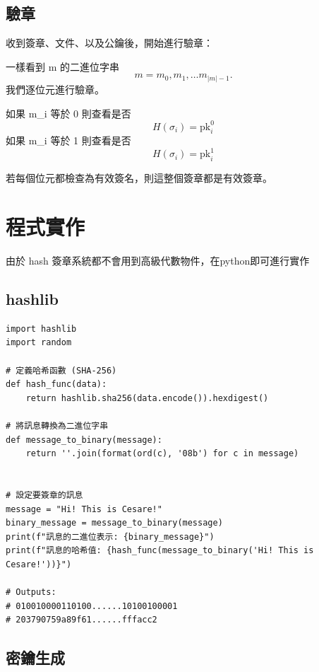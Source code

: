 \documentclass[
]{article}
\begin{document}
\hypertarget{ux9a57ux7ae0}{%
\subsection{驗章}\label{ux9a57ux7ae0}}

收到簽章、文件、以及公鑰後，開始進行驗章：

一樣看到 m 的二進位字串 \[
m = m_{0},m_{1},\dots m_{|m|-1}.
\] 我們逐位元進行驗章。

如果 m\_i 等於 0 則查看是否 \[
H(\sigma_{i}) = \mathrm{pk}_{i}^{0}
\] 如果 m\_i 等於 1 則查看是否 \[
H(\sigma_{i}) = \mathrm{pk}_{i}^{1}
\]

若每個位元都檢查為有效簽名，則這整個簽章都是有效簽章。

\hypertarget{ux7a0bux5f0fux5be6ux4f5c}{%
\section{程式實作}\label{ux7a0bux5f0fux5be6ux4f5c}}

由於 hash 簽章系統都不會用到高級代數物件，在python即可進行實作

\hypertarget{hashlib}{%
\subsection{hashlib}\label{hashlib}}

\begin{verbatim}
import hashlib
import random

# 定義哈希函數 (SHA-256)
def hash_func(data):
    return hashlib.sha256(data.encode()).hexdigest()

# 將訊息轉換為二進位字串
def message_to_binary(message):
    return ''.join(format(ord(c), '08b') for c in message)


# 設定要簽章的訊息
message = "Hi! This is Cesare!"
binary_message = message_to_binary(message)
print(f"訊息的二進位表示: {binary_message}")
print(f"訊息的哈希值: {hash_func(message_to_binary('Hi! This is Cesare!'))}")

# Outputs:
# 010010000110100......10100100001
# 203790759a89f61......fffacc2
\end{verbatim}

\hypertarget{ux5bc6ux9470ux751fux6210-1}{%
\subsection{密鑰生成}\label{ux5bc6ux9470ux751fux6210-1}}
\end{document}
